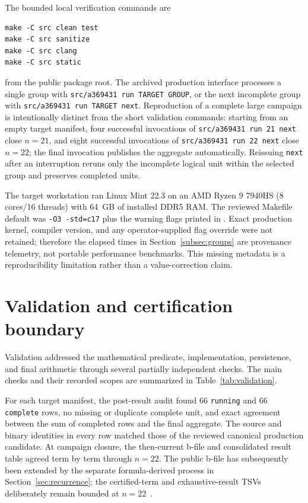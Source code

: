 \documentclass[11pt]{article}
\theoremstyle{definition}
\theoremstyle{remark}
\begin{document}
The bounded local verification commands are
\begin{verbatim}
make -C src clean test
make -C src sanitize
make -C src clang
make -C src static
\end{verbatim}
from the public package root.  The archived production interface processes a
single group with \texttt{src/a369431 run TARGET GROUP}, or the next incomplete
group with \texttt{src/a369431 run TARGET next}.  Reproduction of a complete
large campaign is intentionally distinct from the short validation commands:
starting from an empty target manifest, four successful invocations of
\texttt{src/a369431 run 21 next} close $n=21$, and eight successful
invocations of \texttt{src/a369431 run 22 next} close $n=22$; the final
invocation publishes the aggregate automatically.  Reissuing \texttt{next}
after an interruption reruns only the incomplete logical unit within the
selected group and preserves completed units.

The target workstation ran Linux Mint 22.3 on an AMD Ryzen 9 7940HS
(8 cores/16 threads) with 64~GB of installed DDR5 RAM.  The reviewed Makefile
default was \texttt{-O3 -std=c17} plus the warning flags printed in
.  Exact production kernel, compiler version, and any
operator-supplied flag override were not retained; therefore the elapsed times
in Section~\ref{subsec:groups} are provenance telemetry, not portable
performance benchmarks.  This missing metadata is a reproducibility
limitation rather than a value-correction claim.

\section{Validation and certification boundary}
\label{sec:validation}

Validation addressed the mathematical predicate, implementation, persistence,
and final arithmetic through several partially independent checks.  The main
checks and their recorded scopes are summarized in Table~\ref{tab:validation}.

For each target manifest, the post-result audit found 66 \texttt{running} and
66 \texttt{complete} rows, no missing or duplicate complete unit, and exact
agreement between the sum of completed rows and the final aggregate.  The
source and binary identities in every row matched those of the reviewed
canonical production candidate.  At campaign closure, the then-current b-file
and consolidated result table agreed term by term through $n=22$.  The public
b-file has subsequently been extended by the separate formula-derived process
in Section~\ref{sec:recurrence}; the certified-term and exhaustive-result TSVs
deliberately remain bounded at $n=22$~\cite{cortiA369431Package2026}.
\end{document}
